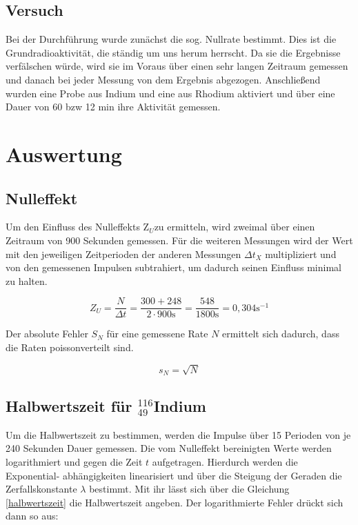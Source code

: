 	\subsection{Versuch}
Bei der Durchführung wurde zunächst die sog. Nullrate bestimmt. Dies ist die Grundradioaktivität, die ständig um uns herum herrscht. Da sie die Ergebnisse verfälschen würde, wird sie im Voraus über einen sehr langen Zeitraum gemessen und danach bei jeder Messung von dem Ergebnis abgezogen.
Anschließend wurden eine Probe aus Indium und eine aus Rhodium aktiviert und über eine Dauer von 60 bzw 12 min ihre Aktivität gemessen.

\section{Auswertung}
\subsection{Nulleffekt}
Um den Einfluss des Nulleffekts Z$_U$zu ermitteln, wird zweimal über einen Zeitraum von 900 Sekunden gemessen. Für
die weiteren Messungen wird der Wert mit den jeweiligen Zeitperioden der anderen Messungen $\Delta t_X$ multipliziert und
von den gemessenen Impulsen subtrahiert, um dadurch seinen Einfluss minimal zu halten. 

\begin{equation}
 Z_U = \frac{N}{\Delta t} = \frac{300 + 248}{2 \cdot 900 \text{s}} = \frac{548}{1800 \text{s}} = 0,304 \text{s}^{-1}
\end{equation}

Der absolute Fehler $S_N$ für eine gemessene Rate $N$ ermittelt sich dadurch, dass die Raten poissonverteilt sind.

\begin{equation}
 s_N = \sqrt{N}
\end{equation}

\subsection{Halbwertszeit für $^{116}_{49}$Indium}
Um die Halbwertszeit zu bestimmen, werden die Impulse über 15 Perioden von je 240 Sekunden Dauer gemessen. Die vom
Nulleffekt bereinigten Werte werden logarithmiert und gegen die Zeit $t$ aufgetragen. Hierdurch werden die Exponential-
abhängigkeiten linearisiert und über die Steigung der Geraden die Zerfallskonstante $\lambda$ bestimmt. Mit ihr lässt sich
über die Gleichung \eqref{halbwertszeit} die Halbwertszeit angeben. Der logarithmierte Fehler drückt sich dann so aus:

